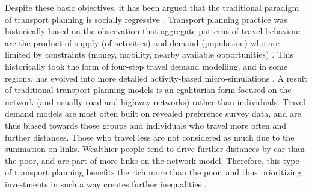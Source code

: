 Despite these basic objectives, it has been argued that the traditional paradigm of transport planning is socially regressive \cite{martens_transport_2016}. Transport planning practice was historically based on the observation that aggregate patterns of travel behaviour are the product of supply (of activities) and demand (population) who are limited by constraints (money, mobility, nearby available opportunities) \cite{hanson_determinants_1982,wegener_land-use_2004}.
This historically took the form of four-step travel demand modelling, and in some regions, has evolved into more detailed activity-based micro-simulations \cite{wegener_land-use_2004}. A result of traditional transport planning models is an egalitarian form focused on the network (and usually road and highway networks) rather than individuals. Travel demand models are most often built on revealed preference survey data, and are thus biased towards those groups and individuals who travel more often and further distances. Those who travel less are not considered as much due to the summation on links. Wealthier people tend to drive further distances by car than the poor, and are part of more links on the network model. Therefore, this type of transport planning benefits the rich more than the poor, and thus prioritizing investments in such a way creates further inequalities \cite{martens_transport_2016}.


